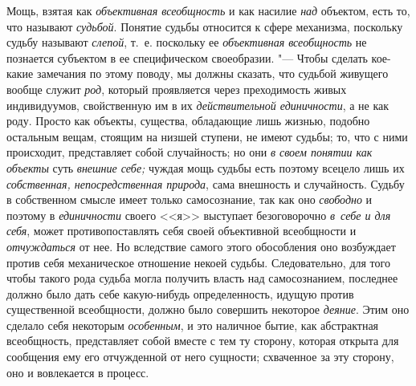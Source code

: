 Мощь, взятая как
{\em объективная всеобщность}
и как насилие {\em над}
объектом, есть то, что называют
{\em судьбой}. Понятие
судьбы относится к сфере механизма, поскольку судьбу называют
{\em слепой}, т.~е.
поскольку ее {\em объективная
всеобщность} не познается субъектом в ее специфическом
своеобразии. "--- Чтобы сделать кое-какие замечания
по этому поводу, мы должны сказать, что судьбой живущего вообще служит
{\em род}, который
проявляется через преходимость живых индивидуумов, свойственную им в их
{\em действительной единичности},
а не как роду. Просто как объекты, существа, обладающие лишь
жизнью, подобно остальным вещам, стоящим на низшей ступени, не имеют
судьбы; то, что с ними происходит, представляет собой случайность; но они
{\em в своем понятии как объекты}
суть {\em внешние себе;}
чуждая мощь судьбы есть поэтому всецело лишь их
{\em собственная, непосредственная
природа}, сама внешность и случайность. Судьбу в собственном
смысле имеет только самосознание, так как оно
{\em свободно} и поэтому
в {\em единичности}
своего <<я>> выступает безоговорочно
{\em в~себе и для себя},
может противопоставлять себя своей объективной всеобщности и
{\em отчуждаться} от нее.
Но вследствие самого этого обособления оно возбуждает против
себя механическое отношение некоей судьбы. Следовательно, для того чтобы
такого рода судьба могла получить власть над самосознанием, последнее
должно было дать себе какую-нибудь определенность, идущую против
существенной всеобщности, должно было совершить некоторое
{\em деяние}. Этим оно
сделало себя некоторым {\em особенным},
и это наличное бытие, как абстрактная всеобщность,
представляет собой вместе с тем ту сторону, которая открыта для сообщения
ему его отчужденной от него сущности; схваченное за эту сторону, оно и
вовлекается в
процесс.
